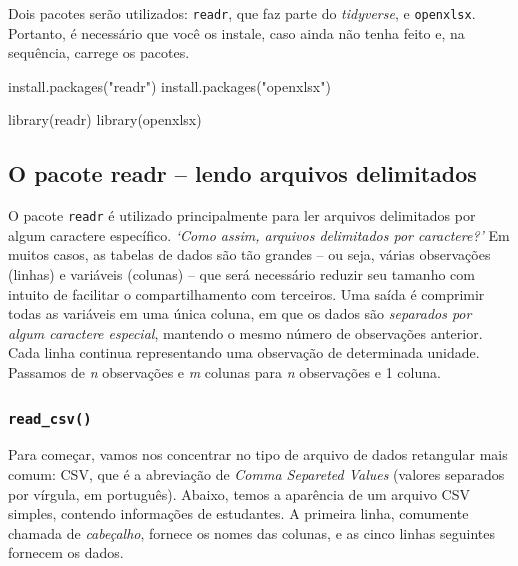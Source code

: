 \documentclass[
  letterpaper,
  DIV=11,
  numbers=noendperiod]{scrreprt}
\newenvironment{Shaded}{\begin{snugshade}}{\end{snugshade}}
\newcommand{\FunctionTok}[1]{\textcolor[rgb]{0.28,0.35,0.67}{#1}}
\newcommand{\NormalTok}[1]{\textcolor[rgb]{0.00,0.23,0.31}{#1}}
\newcommand{\StringTok}[1]{\textcolor[rgb]{0.13,0.47,0.30}{#1}}
\begin{document}
Dois pacotes serão utilizados: \texttt{readr}, que faz parte do
\emph{tidyverse}, e \texttt{openxlsx}. Portanto, é necessário que você
os instale, caso ainda não tenha feito e, na sequência, carrege os
pacotes.

\begin{Shaded}
\begin{Highlighting}[]
\FunctionTok{install.packages}\NormalTok{(}\StringTok{"readr"}\NormalTok{)}
\FunctionTok{install.packages}\NormalTok{(}\StringTok{"openxlsx"}\NormalTok{)}

\FunctionTok{library}\NormalTok{(readr)}
\FunctionTok{library}\NormalTok{(openxlsx)}
\end{Highlighting}
\end{Shaded}

\subsection{O pacote readr -- lendo arquivos
delimitados}\label{o-pacote-readr-lendo-arquivos-delimitados}

O pacote \texttt{readr} é utilizado principalmente para ler arquivos
delimitados por algum caractere específico. \emph{`Como assim, arquivos
delimitados por caractere?'} Em muitos casos, as tabelas de dados são
tão grandes -- ou seja, várias observações (linhas) e variáveis
(colunas) -- que será necessário reduzir seu tamanho com intuito de
facilitar o compartilhamento com terceiros. Uma saída é comprimir todas
as variáveis em uma única coluna, em que os dados são \emph{separados
por algum caractere especial}, mantendo o mesmo número de observações
anterior. Cada linha continua representando uma observação de
determinada unidade. Passamos de \emph{n} observações e \emph{m} colunas
para \emph{n} observações e 1 coluna.

\subsubsection{\texorpdfstring{\texttt{read\_csv()}}{read\_csv()}}\label{read_csv}

Para começar, vamos nos concentrar no tipo de arquivo de dados
retangular mais comum: CSV, que é a abreviação de \emph{Comma Separeted
Values} (valores separados por vírgula, em português). Abaixo, temos a
aparência de um arquivo CSV simples, contendo informações de estudantes.
A primeira linha, comumente chamada de \emph{cabeçalho}, fornece os
nomes das colunas, e as cinco linhas seguintes fornecem os dados.
\end{document}
